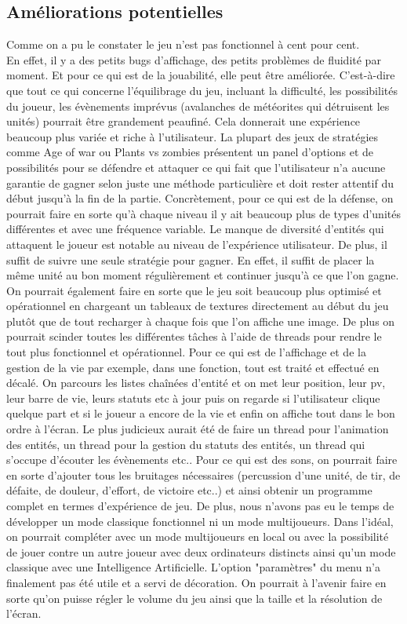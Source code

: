 \documentclass[a4paper,11pt]{article}
\begin{document}
\subsection{Améliorations potentielles}
Comme on a pu le constater le jeu n'est pas fonctionnel à cent pour cent.\\
En effet, il y a des petits bugs d'affichage, des petits problèmes de fluidité par moment.
Et pour ce qui est de la jouabilité, elle peut être améliorée. C'est-à-dire que tout ce qui concerne l'équilibrage du
jeu, incluant la difficulté, les possibilités du joueur, les évènements imprévus (avalanches de météorites qui détruisent les unités) 
pourrait être grandement peaufiné. Cela donnerait une expérience beaucoup plus variée et riche à l'utilisateur. La plupart des
jeux de stratégies comme Age of war ou Plants vs zombies présentent un panel d'options et de possibilités pour se défendre et attaquer
ce qui fait que l'utilisateur n'a aucune garantie de gagner selon juste une méthode particulière et doit rester attentif 
du début jusqu'à la fin de la partie. Concrètement, pour ce qui est de la défense, on pourrait faire en sorte qu'à chaque niveau il y ait
beaucoup plus de types d'unités différentes et avec une fréquence variable. Le manque de diversité d'entités qui attaquent le joueur est
notable au niveau de l'expérience utilisateur. De plus, il suffit de suivre une seule stratégie pour gagner. En effet,
il suffit de placer la même unité au bon moment régulièrement et continuer jusqu'à ce que l'on gagne.\\
On pourrait également faire en sorte que le jeu soit beaucoup plus optimisé et opérationnel en chargeant un tableaux de textures
directement au début du jeu plutôt que de tout recharger à chaque fois que l'on affiche une image. De plus on pourrait
scinder toutes les différentes tâches à l'aide de threads pour rendre le tout plus fonctionnel et opérationnel. Pour ce qui est de 
l'affichage et de la gestion de la vie par exemple, dans une fonction, tout est traité et effectué en décalé. On parcours les listes chaînées d'entité
et on met leur position, leur pv, leur barre de vie, leurs statuts etc à jour puis on regarde si l'utilisateur clique quelque part et si le joueur
a encore de la vie et enfin on affiche tout dans le bon ordre à l'écran. Le plus judicieux aurait été de faire un thread pour l'animation des entités,
un thread pour la gestion du statuts des entités, un thread qui s'occupe d'écouter les évènements etc..
Pour ce qui est des sons, on pourrait faire en sorte d'ajouter tous les bruitages nécessaires (percussion d'une unité,
de tir, de défaite, de douleur, d'effort, de victoire etc..) et ainsi obtenir un programme complet en termes d'expérience de jeu.
De plus, nous n'avons pas eu le temps de développer un mode classique fonctionnel ni un mode multijoueurs.
Dans l'idéal, on pourrait compléter avec un mode multijoueurs en local ou avec la possibilité de jouer contre un autre joueur
avec deux ordinateurs distincts ainsi qu'un mode classique avec une Intelligence Artificielle.
L'option "paramètres" du menu n'a finalement pas été utile et a servi de décoration. On pourrait à l'avenir
faire en sorte qu'on puisse régler le volume du jeu ainsi que la taille et la résolution de l'écran.
\end{document}
